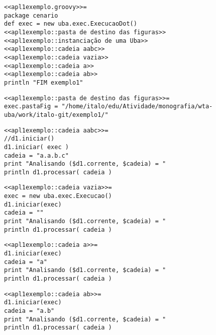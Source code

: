 

\begin{lstlisting}
<<apl1exemplo.groovy>>=
package cenario
def exec = new uba.exec.ExecucaoDot()
<<apl1exemplo::pasta de destino das figuras>>
<<apl1exemplo::instanciação de uma Uba>>
<<apl1exemplo::cadeia aabc>>
<<apl1exemplo::cadeia vazia>>
<<apl1exemplo::cadeia a>>
<<apl1exemplo::cadeia ab>>
println "FIM exemplo1"
\end{lstlisting}

\begin{lstlisting}
<<apl1exemplo::pasta de destino das figuras>>=
exec.pastaFig = "/home/italo/edu/Atividade/monografia/wta-uba/work/italo-git/exemplo1/"
\end{lstlisting}

\begin{lstlisting}
<<apl1exemplo::cadeia aabc>>=
//d1.iniciar()
d1.iniciar( exec )
cadeia = "a.a.b.c"
print "Analisando ($d1.corrente, $cadeia) = "
println d1.processar( cadeia )
\end{lstlisting}

\begin{lstlisting}
<<apl1exemplo::cadeia vazia>>=
exec = new uba.exec.Execucao()
d1.iniciar(exec)
cadeia = ""
print "Analisando ($d1.corrente, $cadeia) = "
println d1.processar( cadeia )
\end{lstlisting}

\begin{lstlisting}
<<apl1exemplo::cadeia a>>=
d1.iniciar(exec)
cadeia = "a"
print "Analisando ($d1.corrente, $cadeia) = "
println d1.processar( cadeia )
\end{lstlisting}

\begin{lstlisting}
<<apl1exemplo::cadeia ab>>=
d1.iniciar(exec)
cadeia = "a.b"
print "Analisando ($d1.corrente, $cadeia) = "
println d1.processar( cadeia )
\end{lstlisting}
